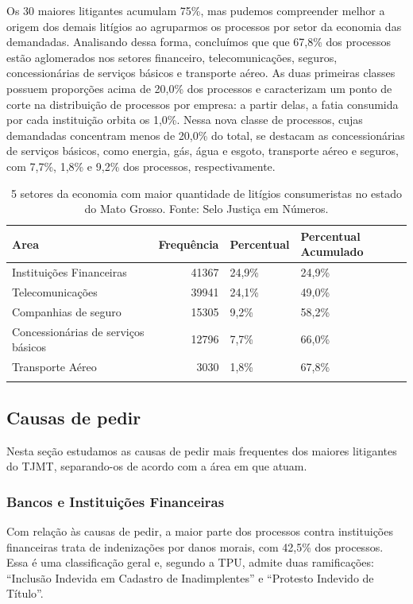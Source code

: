 \documentclass[]{report}
\begin{document}
Os 30 maiores litigantes acumulam 75\%, mas pudemos compreender melhor a
origem dos demais litígios ao agruparmos os processos por setor da
economia das demandadas. Analisando dessa forma, concluímos que que
67,8\% dos processos estão aglomerados nos setores financeiro,
telecomunicações, seguros, concessionárias de serviços básicos e
transporte aéreo. As duas primeiras classes possuem proporções acima de
20,0\% dos processos e caracterizam um ponto de corte na distribuição de
processos por empresa: a partir delas, a fatia consumida por cada
instituição orbita os 1,0\%. Nessa nova classe de processos, cujas
demandadas concentram menos de 20,0\% do total, se destacam as
concessionárias de serviços básicos, como energia, gás, água e esgoto,
transporte aéreo e seguros, com 7,7\%, 1,8\% e 9,2\% dos processos,
respectivamente.

\begin{longtable}{lrll}
\caption{5 setores da economia com maior quantidade de litígios consumeristas no estado do Mato Grosso. Fonte: Selo Justiça em Números.} \\
  \hline
Area & Frequência & Percentual & Percentual Acumulado \\
  \hline
Instituições
Financeiras & 41367 & 24,9\% & 24,9\% \\
  Telecomunicações & 39941 & 24,1\% & 49,0\% \\
  Companhias de
seguro & 15305 & 9,2\% & 58,2\% \\
  Concessionárias
de serviços
básicos & 12796 & 7,7\% & 66,0\% \\
  Transporte
Aéreo & 3030 & 1,8\% & 67,8\% \\
   \hline
\hline
\label{unnamed-chunk-43}
\end{longtable}

\subsection{Causas de pedir}\label{causas-de-pedir-3}

Nesta seção estudamos as causas de pedir mais frequentes dos maiores
litigantes do TJMT, separando-os de acordo com a área em que atuam.

\subsubsection{Bancos e Instituições
Financeiras}\label{bancos-e-instituicoes-financeiras-3}

Com relação às causas de pedir, a maior parte dos processos contra
instituições financeiras trata de indenizações por danos morais, com
42,5\% dos processos. Essa é uma classificação geral e, segundo a TPU,
admite duas ramificações: ``Inclusão Indevida em Cadastro de
Inadimplentes'' e ``Protesto Indevido de Título''.
\end{document}
